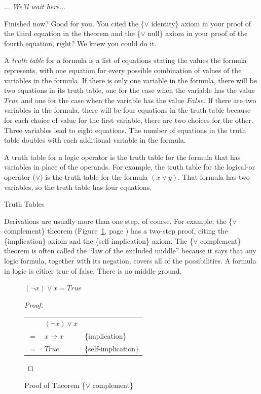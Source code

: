 \smallskip
$\dots$ \emph{We'll wait here}$\dots$
\smallskip

Finished now? Good for you. You cited the \{$\vee$ identity\} axiom in your
proof of the third equation in the theorem and the \{$\vee$ null\}
axiom in your proof of the fourth equation, right? We knew you could do it.

\begin{aside}
A \emph{truth table} for a formula is a list of equations
stating the values the formula represents,
with one equation for every possible combination of values
of the variables in the formula.
If there is only one variable in the formula,
there will be two equations in its truth table,
one for the case when the variable has the value
$True$ and one for the case when the variable has the value $False$.
If there are two variables in the formula,
there will be four equations in the truth table
because for each choice of value for the first variable,
there are two choices for the other.
Three variables lead to eight equations.
The number of equations in the truth table
doubles with each additional variable
in the formula.

A truth table for a logic operator is the truth table for the formula
that has variables in place of the operands.
For example, the truth table for the logical-or operator ($\vee$)
is the truth table for the formula $(x \vee y)$.
That formula has two variables, so the truth table has four equations.
\caption{Truth Tables}
\label{truth-tables}
\end{aside}

Derivations are usually more than one step, of course.
For example, the
\{$\vee$ complement\} theorem
(Figure~\ref{fig:or-complement-thm}, page \pageref{fig:or-complement-thm})
has a two-step proof, citing the \{implication\} axiom
and the \{self-implication\} axiom.
The \{$\vee$ complement\} theorem is often called the
``law of the excluded middle'' because it says that any
logic formula, together with its negation, covers all
of the possibilities.
A formula in logic is either true of false.
There is no middle ground.

\begin{figure}
\begin{theorem}
$(\neg x) \vee x = True$
\end{theorem}
\begin{proof}
\mbox{}\\
\begin{tabular}{lll}
    & $(\neg x) \vee x$ & \\
$=$ & $x \rightarrow x$ & \{implication\} \\
$=$ & $True$            & \{self-implication\} \\
\end{tabular}

\end{proof}
\caption{Proof of Theorem \{$\vee$ complement\}}
\label{fig:or-complement-thm}
\end{figure}

